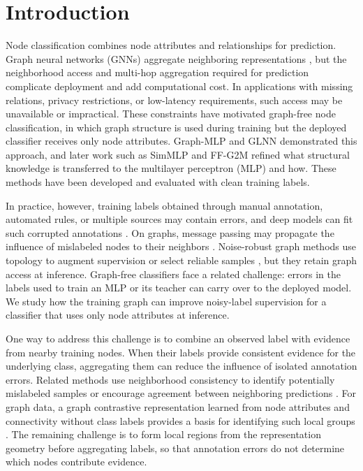 \documentclass[times,review,10pt]{elsarticle}
\theoremstyle{definition}
\theoremstyle{plain}
\begin{document}
\section{Introduction}\label{sec:1}

Node classification combines node attributes and relationships for prediction. Graph neural networks (GNNs) aggregate neighboring representations \cite{ref1}, but the neighborhood access and multi-hop aggregation required for prediction complicate deployment and add computational cost. In applications with missing relations, privacy restrictions, or low-latency requirements, such access may be unavailable or impractical. These constraints have motivated graph-free node classification, in which graph structure is used during training but the deployed classifier receives only node attributes. Graph-MLP \cite{ref3} and GLNN \cite{ref4} demonstrated this approach, and later work such as SimMLP \cite{ref41} and FF-G2M \cite{ref45} refined what structural knowledge is transferred to the multilayer perceptron (MLP) and how. These methods have been developed and evaluated with clean training labels.

In practice, however, training labels obtained through manual annotation, automated rules, or multiple sources may contain errors, and deep models can fit such corrupted annotations \cite{ref24}. On graphs, message passing may propagate the influence of mislabeled nodes to their neighbors \cite{ref6}. Noise-robust graph methods use topology to augment supervision \cite{ref7} or select reliable samples \cite{ref9}, but they retain graph access at inference. Graph-free classifiers face a related challenge: errors in the labels used to train an MLP or its teacher can carry over to the deployed model. We study how the training graph can improve noisy-label supervision for a classifier that uses only node attributes at inference.

One way to address this challenge is to combine an observed label with evidence from nearby training nodes. When their labels provide consistent evidence for the underlying class, aggregating them can reduce the influence of isolated annotation errors. Related methods use neighborhood consistency to identify potentially mislabeled samples or encourage agreement between neighboring predictions \cite{ref10,ref11}. For graph data, a graph contrastive representation learned from node attributes and connectivity without class labels provides a basis for identifying such local groups \cite{ref12}. The remaining challenge is to form local regions from the representation geometry before aggregating labels, so that annotation errors do not determine which nodes contribute evidence.
\end{document}
